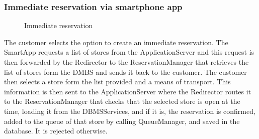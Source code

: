 \subsubsection{Immediate reservation via smartphone app}
\begin{figure}[H]
	\noindent
	\caption{Immediate reservation} 
\end{figure}
The customer selects the option to create an immediate reservation. The SmartApp requests a list of stores from the ApplicationServer and this request is then forwarded by the Redirector to the ReservationManager that retrieves the list of stores form the DMBS and sends it back to the customer. The customer then selects a store form the list provided and a means of transport. This information is then sent to the ApplicationServer where the Redirector routes it to the ReservationManager that checks that the selected store is open at the time, loading it from the DBMSServices, and if it is, the reservation is confirmed, added to the queue of that store by calling QueueManager, and saved in the database. It is rejected otherwise.
